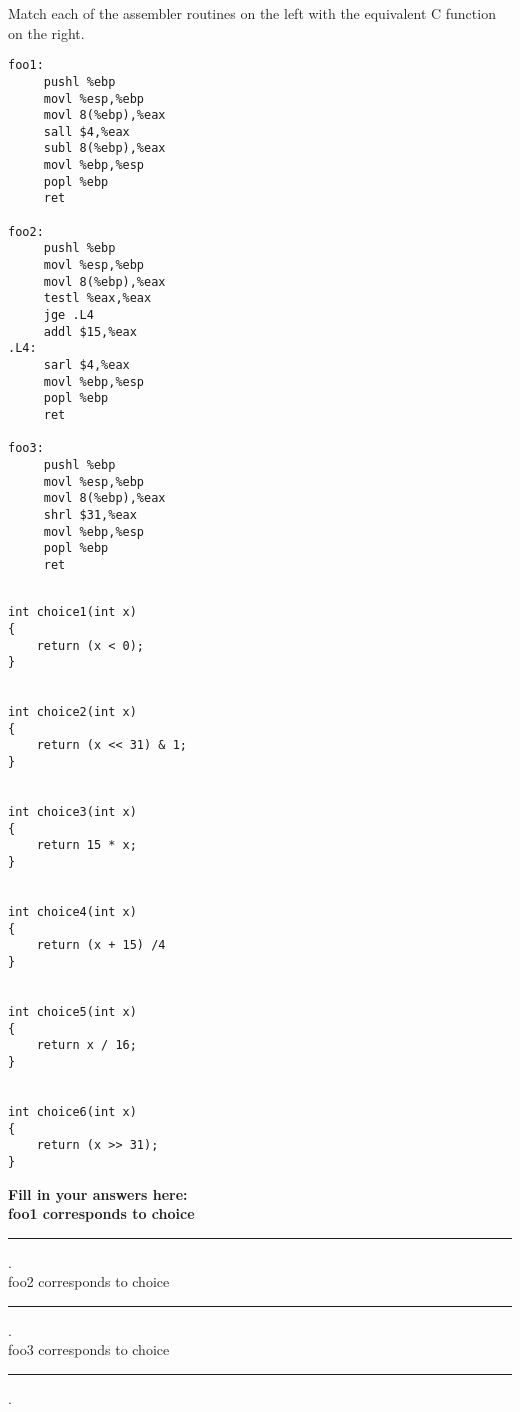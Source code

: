 \begin{problem}{7}

\noindent
Match each of the assembler routines on the left with the equivalent
C function on the right.

\vspace{.2in}
\begin{minipage}[l]{2.5in}

\begin{verbatim}
foo1:
     pushl %ebp
     movl %esp,%ebp
     movl 8(%ebp),%eax
     sall $4,%eax
     subl 8(%ebp),%eax
     movl %ebp,%esp
     popl %ebp
     ret

foo2:
     pushl %ebp
     movl %esp,%ebp
     movl 8(%ebp),%eax
     testl %eax,%eax
     jge .L4
     addl $15,%eax
.L4:
     sarl $4,%eax
     movl %ebp,%esp
     popl %ebp
     ret

foo3:
     pushl %ebp
     movl %esp,%ebp
     movl 8(%ebp),%eax
     shrl $31,%eax
     movl %ebp,%esp
     popl %ebp
     ret


\end{verbatim}




\end{minipage}\makebox[1in]{}\begin{minipage}[r]{2.5in}
\begin{verbatim}
int choice1(int x)
{
    return (x < 0);
}


int choice2(int x)
{
    return (x << 31) & 1;
}


int choice3(int x)
{
    return 15 * x;
}


int choice4(int x)
{
    return (x + 15) /4
}


int choice5(int x)
{
    return x / 16;
}


int choice6(int x)
{
    return (x >> 31);    
}

\end{verbatim}
\bf{Fill in your answers here:}\\
\normalfont
\noindent foo1 corresponds to choice \rule{45pt}{.1pt}.\\
foo2 corresponds to choice \rule{45pt}{.1pt}.\\
foo3 corresponds to choice \rule{45pt}{.1pt}.\\
\end{minipage}


\end{problem}
